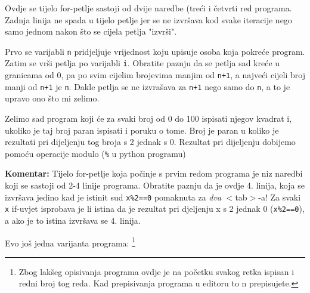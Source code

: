 Ovdje se tijelo for-petlje sastoji od dvije naredbe (treći i
četvrti red programa. Zadnja linija ne spada u tijelo petlje jer
se ne izvršava kod svake iteracije nego samo jednom nakon što se
cijela petlja "izvrši".

Prvo se varijabli \verb"n" pridjeljuje vrijednost koju upisuje
osoba koja pokreće program. Zatim se vrši petlja po varijabli
\verb"i". Obratite paznju da se petlja sad kreće u granicama od
0, pa po svim cijelim brojevima manjim od \verb"n+1", a najveći
cijeli broj manji od \verb"n+1" je \verb"n". Dakle petlja se ne
izvrašava za \verb"n+1" nego samo do \verb"n", a to je upravo ono
što mi zelimo.

Zelimo sad program koji će za svaki broj od 0 do 100 ispisati
njegov kvadrat i, ukoliko je taj broj paran ispisati i poruku o
tome. Broj je paran u koliko je rezultati pri dijeljenju tog broja
s 2 jednak s 0. Rezultat pri dijeljenju dobijemo pomoću operacije
modulo (\verb"%" u python programu)


\textbf{Komentar:} Tijelo for-petlje koja počinje s prvim redom
programa je niz naredbi koji se sastoji od 2-4 linije programa.
Obratite paznju da je ovdje 4. linija, koja se izvršava jedino
kad je istinit sud \verb"x%2==0" pomaknuta za \emph{dva} $<$tab$>$-a!
Za svaki \verb"x" if-uvjet isprobava je li istina da je rezultat
pri djeljenju x s 2 jednak 0 (\verb"x%2==0"), a ako je to istina
izvršava se 4. linija.

Evo još jedna varijanta programa:
\footnote{
Zbog lakšeg opisivanja programa ovdje je na početku svakog retka
ispisan i redni broj tog reda. Kad prepisivanja programa u editoru to n
prepisujete.
}


